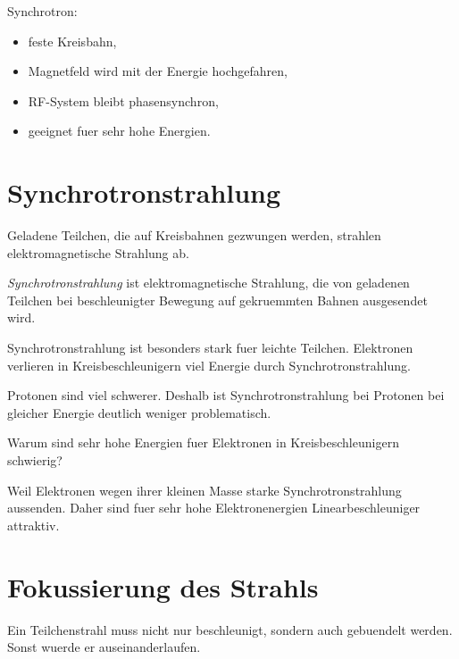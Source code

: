 \begin{examtipbox}
Synchrotron:
\begin{itemize}
    \item feste Kreisbahn,
    \item Magnetfeld wird mit der Energie hochgefahren,
    \item RF-System bleibt phasensynchron,
    \item geeignet fuer sehr hohe Energien.
\end{itemize}
\end{examtipbox}

\section{Synchrotronstrahlung}

Geladene Teilchen, die auf Kreisbahnen gezwungen werden, strahlen elektromagnetische
Strahlung ab.

\begin{definitionbox}
\emph{Synchrotronstrahlung} ist elektromagnetische Strahlung, die von geladenen
Teilchen bei beschleunigter Bewegung auf gekruemmten Bahnen ausgesendet wird.
\end{definitionbox}

\begin{conceptbox}
Synchrotronstrahlung ist besonders stark fuer leichte Teilchen.
Elektronen verlieren in Kreisbeschleunigern viel Energie durch Synchrotronstrahlung.

Protonen sind viel schwerer.
Deshalb ist Synchrotronstrahlung bei Protonen bei gleicher Energie deutlich weniger
problematisch.
\end{conceptbox}

\begin{examtipbox}
Warum sind sehr hohe Energien fuer Elektronen in Kreisbeschleunigern schwierig?

Weil Elektronen wegen ihrer kleinen Masse starke Synchrotronstrahlung aussenden.
Daher sind fuer sehr hohe Elektronenergien Linearbeschleuniger attraktiv.
\end{examtipbox}

\section{Fokussierung des Strahls}

Ein Teilchenstrahl muss nicht nur beschleunigt, sondern auch gebuendelt werden.
Sonst wuerde er auseinanderlaufen.

